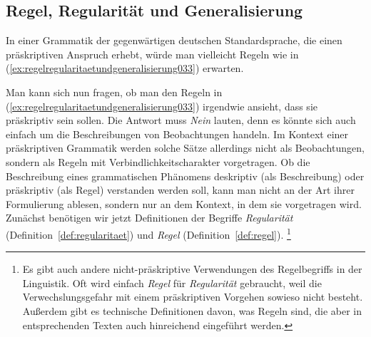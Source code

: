 \subsection{Regel, Regularität und Generalisierung}
\label{sec:regelregularitaetundgeneralisierung}

In einer Grammatik der gegenwärtigen deutschen Standardsprache, die einen präskriptiven Anspruch erhebt, würde man vielleicht Regeln wie in (\ref{ex:regelregularitaetundgeneralisierung033}) erwarten.

\begin{exe}
  \ex\label{ex:regelregularitaetundgeneralisierung033}
  \begin{xlist}
  \end{xlist}
\end{exe}

Man kann sich nun fragen, ob man den Regeln in (\ref{ex:regelregularitaetundgeneralisierung033}) irgendwie ansieht, dass sie präskriptiv sein sollen.
Die Antwort muss \textit{Nein} lauten, denn es könnte sich auch einfach um die Beschreibungen von Beobachtungen handeln.
Im Kontext einer präskriptiven Grammatik werden solche Sätze allerdings nicht als Beobachtungen, sondern als Regeln mit Verbindlichkeitscharakter vorgetragen.
Ob die Beschreibung eines grammatischen Phänomens deskriptiv (als Beschreibung) oder präskriptiv (als Regel) verstanden werden soll, kann man nicht an der Art ihrer Formulierung ablesen, sondern nur an dem Kontext, in dem sie vorgetragen wird.
Zunächst benötigen wir jetzt Definitionen der Begriffe \textit{Regularität} (Definition~\ref{def:regularitaet}) und \textit{Regel} (Definition~\ref{def:regel}).%
\footnote{Es gibt auch andere nicht-präskriptive Verwendungen des Regelbegriffs in der Linguistik.
Oft wird einfach \textit{Regel} für \textit{Regularität} gebraucht, weil die Verwechslungsgefahr mit einem präskriptiven Vorgehen sowieso nicht besteht.
Außerdem gibt es technische Definitionen davon, was Regeln sind, die aber in entsprechenden Texten auch hinreichend eingeführt werden.}



